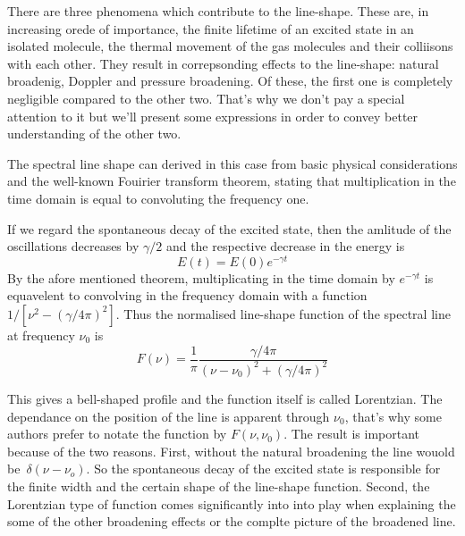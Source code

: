 There are three phenomena which contribute to the line-shape. These
are, in increasing orede of importance, the finite lifetime of an
excited state in an isolated molecule, the thermal movement of the gas
molecules and their colliisons with each other. They result in
correpsonding effects to the line-shape: natural broadenig, Doppler
and pressure broadening. Of these, the first one is completely
negligible compared to the other two. That's why we don't pay a special
attention to it but we'll present some expressions in order to convey
better understanding of the other two.

The spectral line shape can derived in this case from basic physical
considerations and the well-known Fouirier transform theorem, stating
that  multiplication in the time domain is equal to convoluting the
frequency one.

If we regard the spontaneous decay of the excited state, then the
amlitude of the oscillations decreases by $\gamma/2$ and the
respective decrease in the energy is
\begin{equation}
  E(t)=E(0)e^{-\gamma t}
\label{}
\end{equation}
By the afore mentioned theorem, multiplicating in the time domain by
$e^{-\gamma t}$ is equavelent to convolving in the frequency domain
with a function $1/[\nu^2 - (\gamma/4\pi)^2]$. Thus the normalised
line-shape function of the spectral line at frequency $\nu_0$ is 
\begin{equation}
  F(\nu)=\frac{1}{\pi}\frac{\gamma/4\pi}{(\nu - \nu_0)^2 + (\gamma/4\pi)^2}
\label{}
\end{equation}

This gives a bell-shaped profile and the function itself is called
Lorentzian. The dependance on the position of the line is apparent
through $\nu_0$, that's why some authors prefer to notate the function
by $F(\nu,\nu_0)$.
The result is important because of the two reasons. First, without the
natural broadening the line wouold be~$\delta (\nu - \nu_o)$. So the
spontaneous decay of the excited state is responsible for the finite
width and the certain shape of the line-shape function. Second, the
Lorentzian type of function comes significantly into into play when
explaining the some of the other broadening effects or the complte
picture of the broadened line.

